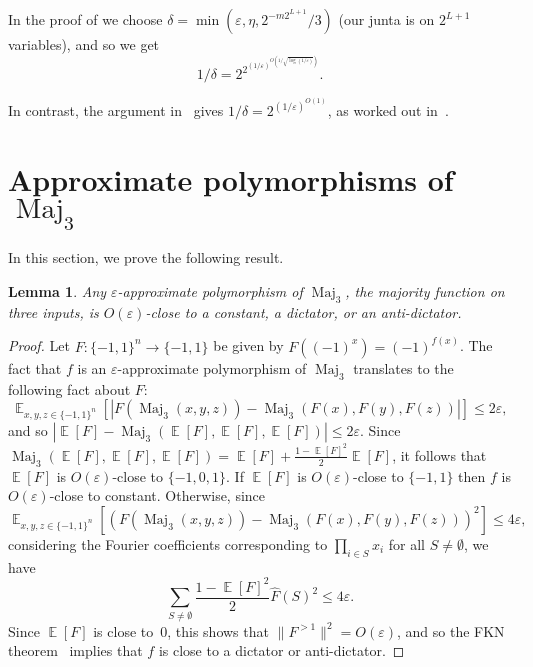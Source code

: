 \documentclass{article}
\newtheorem{lemma}[theorem]{Lemma}
\theoremstyle{definition}
\theoremstyle{remark}
\DeclareMathOperator*{\E}{\mathbb{E}}
\DeclareMathOperator{\Maj}{Maj}
\newcommand\eps{\varepsilon}
\renewcommand\epsilon{\eps}
\renewcommand\leq{\leqslant}
\begin{document}
In the proof of  we choose $\delta = \min(\epsilon,\eta,2^{-m2^{L+1}}/3)$ (our junta is on $2^{L+1}$ variables), and so we get
\[
 1/\delta = 2^{2^{(1/\epsilon)^{O(1/\sqrt{\log(1/\epsilon)})}}}.
\]

In contrast, the argument in~\cite{FLMM2020} gives $1/\delta = 2^{(1/\epsilon)^{O(1)}}$, as worked out in~\cite{SimpleAND}.

\section{Approximate polymorphisms of \texorpdfstring{$\Maj_3$}{Maj3}} \label{apx:Maj3}

In this section, we prove the following result.

\begin{lemma} \label{lem:maj3}
Any $\epsilon$-approximate polymorphism of $\Maj_3$, the majority function on three inputs, is $O(\epsilon)$-close to a constant, a dictator, or an anti-dictator.
\end{lemma}
\begin{proof}
Let $F\colon \{-1,1\}^n \to \{-1,1\}$ be given by $F((-1)^x) = (-1)^{f(x)}$. The fact that $f$ is an $\epsilon$-approximate polymorphism of $\Maj_3$ translates to the following fact about $F$:
\[
 \E_{x,y,z \in \{-1,1\}^n}[|F(\Maj_3(x,y,z)) - \Maj_3(F(x),F(y),F(z))|] \leq 2\epsilon,
\]
and so $|\E[F] - \Maj_3(\E[F],\E[F],\E[F])| \leq 2\epsilon$. Since $\Maj_3(\E[F],\E[F],\E[F]) = \E[F] + \frac{1-\E[F]^2}{2} \E[F]$, it follows that $\E[F]$ is $O(\epsilon)$-close to $\{-1,0,1\}$. If $\E[F]$ is $O(\epsilon)$-close to $\{-1,1\}$ then $f$ is $O(\epsilon)$-close to constant. Otherwise, since
\[
 \E_{x,y,z \in \{-1,1\}^n}[(F(\Maj_3(x,y,z)) - \Maj_3(F(x),F(y),F(z)))^2] \leq 4\epsilon,
\]
considering the Fourier coefficients corresponding to $\prod_{i \in S} x_i$ for all $S \neq \emptyset$, we have
\[
 \sum_{S \neq \emptyset} \frac{1-\E[F]^2}{2} \hat{F}(S)^2 \leq 4\epsilon.
\]
Since $\E[F]$ is close to~$0$, this shows that $\|F^{>1}\|^2 = O(\epsilon)$, and so the FKN theorem~\cite{FKN} implies that $f$ is close to a dictator or anti-dictator.
\end{proof}
\end{document}
